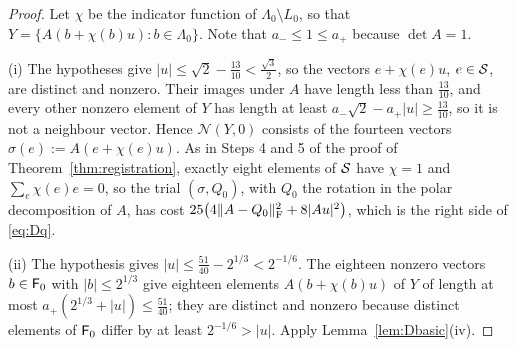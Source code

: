 \begin{proof}
Let $\chi$ be the indicator function of $\Lambda_0\setminus L_0$, so that $Y=\{A(b+\chi(b)u):b\in\Lambda_0\}$. Note that
$a_-\le1\le a_+$ because $\det A=1$.

(i) The hypotheses give $|u|\le\sqrt2-\frac{13}{10}<\frac{\sqrt3}2$, so the vectors $e+\chi(e)u$, $e\in\mathcal S$, are distinct and
nonzero. Their images under $A$ have length less than $\frac{13}{10}$, and every other nonzero element of $Y$ has length at least
$a_-\sqrt2-a_+|u|\ge\frac{13}{10}$, so it is not a neighbour vector. Hence $\mathcal N(Y,0)$ consists of the fourteen vectors
$\sigma(e):=A(e+\chi(e)u)$. As in Steps 4 and 5 of the proof of Theorem~\ref{thm:registration}, exactly eight elements of $\mathcal S$ have
$\chi=1$ and $\sum_e\chi(e)e=0$, so the trial $(\sigma,Q_0)$, with $Q_0$ the rotation in the polar decomposition of $A$, has cost
$25\bigl(4\|A-Q_0\|_\mathrm F^2+8|Au|^2\bigr)$, which is the right side of \eqref{eq:Dq}.

(ii) The hypothesis gives $|u|\le\frac{51}{40}-2^{1/3}<2^{-1/6}$. The eighteen nonzero vectors $b\in\mathsf F_0$ with $|b|\le2^{1/3}$ give
eighteen elements $A(b+\chi(b)u)$ of $Y$ of length at most $a_+(2^{1/3}+|u|)\le\frac{51}{40}$; they are distinct and nonzero because
distinct elements of $\mathsf F_0$ differ by at least $2^{-1/6}>|u|$. Apply Lemma~\ref{lem:Dbasic}(iv).
\end{proof}
